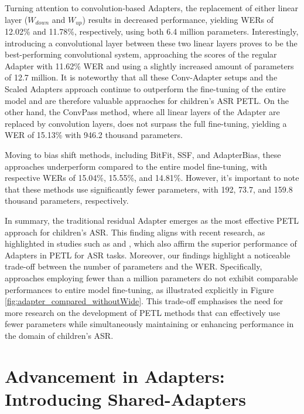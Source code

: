 Turning attention to convolution-based Adapters, the replacement of either linear layer ($W_{down}$ and $W_{up}$) results in decreased performance, yielding WERs of 12.02\% and 11.78\%, respectively, using both 6.4 million parameters. Interestingly, introducing a convolutional layer between these two linear layers proves to be the best-performing convolutional system, approaching the scores of the regular Adapter with 11.62\% \ac{WER} and using a slightly increased amount of parameters of 12.7 million. It is noteworthy that all these Conv-Adapter setups and the Scaled Adapters approach continue to outperform the fine-tuning of the entire model and are therefore valuable appraoches for children's \ac{ASR} \ac{PETL}.
On the other hand, the ConvPass method, where all linear layers of the Adapter are replaced by convolution layers, does not surpass the full fine-tuning, yielding a \ac{WER} of 15.13\% with 946.2 thousand parameters.

Moving to bias shift methods, including BitFit, \ac{SSF}, and AdapterBias, these approaches underperform compared to the entire model fine-tuning, with respective \acp{WER} of 15.04\%, 15.55\%, and 14.81\%. However, it's important to note that these methods use significantly fewer parameters, with 192, 73.7, and 159.8 thousand parameters, respectively.

In summary, the traditional residual Adapter emerges as the most effective \ac{PETL} approach for children's \ac{ASR}. This finding aligns with recent research, as highlighted in studies such as \cite{li2023evaluating} and \cite{cappellazzo2023parameter}, which also affirm the superior performance of Adapters in \ac{PETL} for \ac{ASR} tasks. Moreover, our findings highlight a noticeable trade-off between the number of parameters and the \ac{WER}. Specifically, approaches employing fewer than a million parameters do not exhibit comparable performances to entire model fine-tuning, as illustrated explicitly in Figure \ref{fig:adapter_compared_withoutWide}. This trade-off emphasises the need for more research on the development of \ac{PETL} methods that can effectively use fewer parameters while simultaneously maintaining or enhancing performance in the domain of children's \ac{ASR}.

\section{Advancement in Adapters: Introducing Shared-Adapters}
